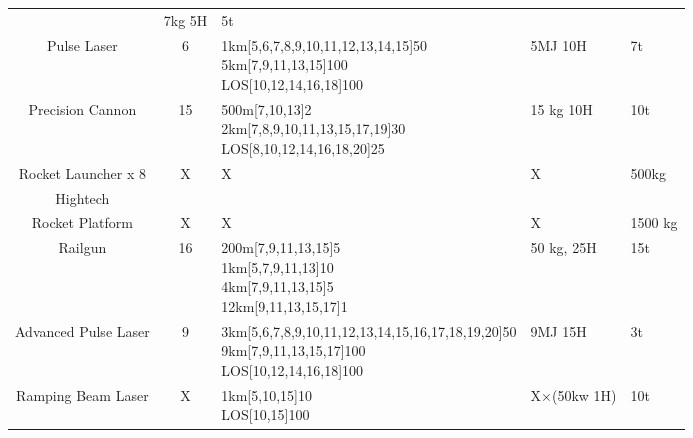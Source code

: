 \begin{tabular}{c|clll}
                                        & 7kg 5H & 5t \\
    Pulse Laser & 6 & \makecell[l]{1km[5,6,7,8,9,10,11,12,13,14,15]50\\
                                   5km[7,9,11,13,15]100\\
                                   LOS[10,12,14,16,18]100}
                                        & 5MJ 10H & 7t\\
    Precision Cannon & 15 & \makecell[l]{500m[7,10,13]2\\
                                         2km[7,8,9,10,11,13,15,17,19]30\\
                                         LOS[8,10,12,14,16,18,20]25}
                                        & 15 kg 10H & 10t\\
    Rocket Launcher x 8 & X & X & X & 500kg \\
    \hline Hightech &&&&\\
    Rocket Platform & X & X & X & 1500 kg \\
    Railgun & 16 & \makecell[l]{200m[7,9,11,13,15]5\\
                                1km[5,7,9,11,13]10\\
                                4km[7,9,11,13,15]5\\
                                12km[9,11,13,15,17]1}
                                & 50 kg, 25H & 15t\\
    Advanced Pulse Laser & 9 & \makecell[l]{3km[5,6,7,8,9,10,11,12,13,14,15,16,17,18,19,20]50\\
                                   9km[7,9,11,13,15,17]100\\
                                   LOS[10,12,14,16,18]100}
                                        & 9MJ 15H & 3t\\
    Ramping Beam Laser & X & \makecell[l]{1km[5,10,15]10\\
                                          LOS[10,15]100}
                        & X\(\times\)(50kw 1H) & 10t\\

\end{tabular}\par

